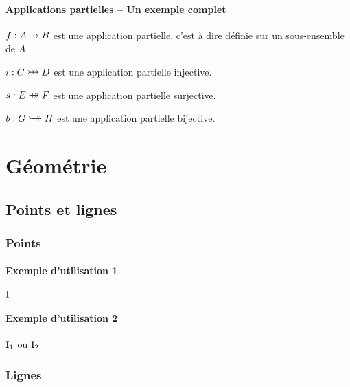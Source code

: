 \documentclass[12pt,a4paper]{article}
\theoremstyle{definition}
\begin{document}


\paragraph{Applications partielles -- Un exemple complet}

\begin{latexex-flat}
$f: A \pto B$ est une application partielle, c'est à dire définie sur
un sous-ensemble de $A$.

$i: C \ponetoone D$ est une application partielle injective.

$s: E \ponto F$ est une application partielle surjective.

$b: G \pbiject H$ est une application partielle bijective.
\end{latexex-flat}


\section{Géométrie}

\subsection{Points et lignes}

\subsubsection{Points}

\paragraph{Exemple d'utilisation 1}

\begin{latexex}
$\pt{I}$
\end{latexex}




\paragraph{Exemple d'utilisation 2}

\begin{latexex}
$\pt*{I}{1}$ ou
$\pt*{I}{2}$
\end{latexex}




\subsubsection{Lignes}
\end{document}
